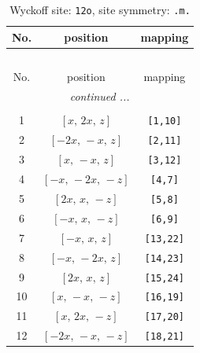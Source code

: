 \documentclass[fleqn,8pt]{jsarticle}
\begin{document}
\begin{longtable}{ccc}
\caption{Wyckoff site: {\tt 12o}, site symmetry: {\tt .m.}}
 \\
 \hline \hline
No. & position & mapping \\ \hline \endfirsthead

\multicolumn{2}{l}{\tablename\ \thetable{}} \\
 \hline \hline
No. & position & mapping \\ \hline \endhead

 \hline \hline
\multicolumn{2}{r}{\footnotesize\it continued ...} \\ \endfoot

 \hline \hline
\multicolumn{2}{r}{} \\ \endlastfoot

1 & $\left[ x,\, 2 x,\, z \right]$ & {\tt [1,10]} \\ \hline
2 & $\left[ - 2 x,\, - x,\, z \right]$ & {\tt [2,11]} \\ \hline
3 & $\left[ x,\, - x,\, z \right]$ & {\tt [3,12]} \\ \hline
4 & $\left[ - x,\, - 2 x,\, - z \right]$ & {\tt [4,7]} \\ \hline
5 & $\left[ 2 x,\, x,\, - z \right]$ & {\tt [5,8]} \\ \hline
6 & $\left[ - x,\, x,\, - z \right]$ & {\tt [6,9]} \\ \hline
7 & $\left[ - x,\, x,\, z \right]$ & {\tt [13,22]} \\ \hline
8 & $\left[ - x,\, - 2 x,\, z \right]$ & {\tt [14,23]} \\ \hline
9 & $\left[ 2 x,\, x,\, z \right]$ & {\tt [15,24]} \\ \hline
10 & $\left[ x,\, - x,\, - z \right]$ & {\tt [16,19]} \\ \hline
11 & $\left[ x,\, 2 x,\, - z \right]$ & {\tt [17,20]} \\ \hline
12 & $\left[ - 2 x,\, - x,\, - z \right]$ & {\tt [18,21]} \\
\end{longtable}
\renewcommand{\arraystretch}{1.2}
\end{document}
